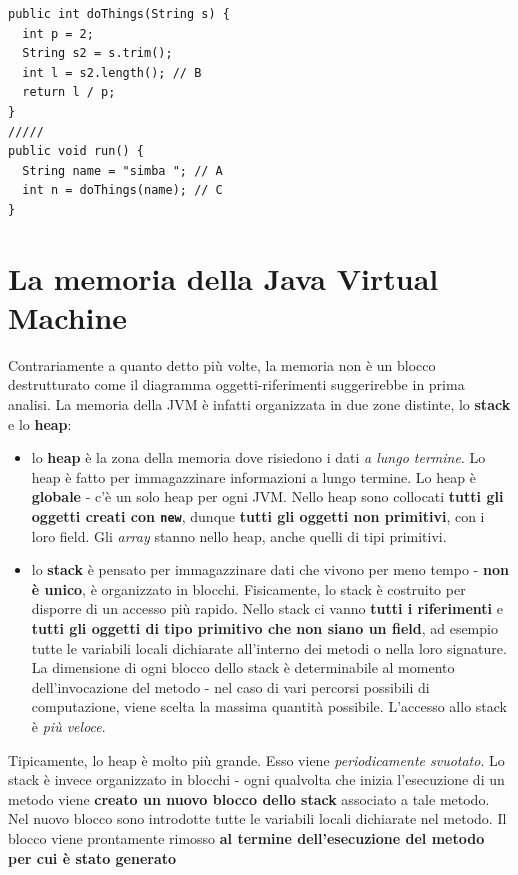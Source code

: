 \documentclass[\fontsizeclass,twocolumn]{\classname}
\theoremstyle{definition}
\theoremstyle{definition}
\begin{document}
\begin{lstlisting}
public int doThings(String s) {
  int p = 2;
  String s2 = s.trim();
  int l = s2.length(); // B
  return l / p;
}
/////
public void run() {
  String name = "simba "; // A
  int n = doThings(name); // C
}
\end{lstlisting}


\chapter{La memoria della Java Virtual Machine}

Contrariamente a quanto detto più volte, la memoria non è un blocco
destrutturato come il diagramma oggetti-riferimenti suggerirebbe in prima
analisi. La memoria della JVM è infatti organizzata in due zone distinte, lo
\textbf{stack} e lo \textbf{heap}:
\begin{itemize}
    \item lo \textbf{heap} è la zona della memoria dove risiedono i dati
        \emph{a lungo termine}. Lo heap è fatto per immagazzinare informazioni
        a lungo termine. Lo heap è \textbf{globale} \-- c'è un solo heap per
        ogni JVM. Nello heap sono collocati \textbf{tutti gli oggetti creati
        con \texttt{new}}, dunque \textbf{tutti gli oggetti non primitivi}, con i loro
        field. Gli \emph{array} stanno nello heap, anche quelli di tipi
        primitivi.
    \item lo \textbf{stack} è pensato per immagazzinare dati che vivono per
        meno tempo \-- \textbf{non è unico}, è organizzato in blocchi.
        Fisicamente, lo stack è costruito per disporre di un accesso più
        rapido. Nello stack ci vanno \textbf{tutti i riferimenti} e
        \textbf{tutti gli oggetti di tipo primitivo che non siano un field}, ad
        esempio tutte le variabili locali dichiarate all'interno dei metodi o
        nella loro signature. La dimensione di ogni blocco dello stack è
        determinabile al momento dell'invocazione del metodo \-- nel caso di
        vari percorsi possibili di computazione, viene scelta la massima
        quantità possibile. L'accesso allo stack è \emph{più veloce}.
\end{itemize}

Tipicamente, lo heap è molto più grande. Esso viene \emph{periodicamente
svuotato}. Lo stack è invece organizzato in blocchi \-- ogni qualvolta che
inizia l'esecuzione di un metodo viene \textbf{creato un nuovo blocco dello
stack} associato a tale metodo. Nel nuovo blocco sono introdotte tutte le
variabili locali dichiarate nel metodo. Il blocco viene prontamente rimosso
\textbf{al termine dell'esecuzione del metodo per cui è stato generato}
\end{document}
